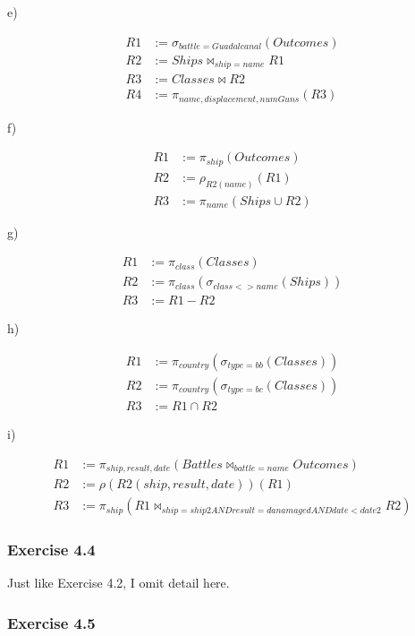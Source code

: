 e)

\begin{align*}
  R1 &:= \sigma_{battle = Guadalcanal}(Outcomes) \\
  R2 &:= Ships \bowtie_{ship = name} R1 \\
  R3 &:= Classes \bowtie R2 \\
  R4 &:= \pi_{name, displacement, numGuns}(R3)
\end{align*}

f)

\begin{align*}
  R1 &:= \pi_{ship}(Outcomes) \\
  R2 &:= \rho_{R2(name)}(R1) \\
  R3 &:= \pi_{name}(Ships \cup R2)
\end{align*}

g)

\begin{align*}
  R1 &:= \pi_{class}(Classes) \\
  R2 &:= \pi_{class}(\sigma_{class <> name}(Ships)) \\
  R3 &:= R1 - R2
\end{align*}

h)

\begin{align*}
  R1 &:= \pi_{country}(\sigma_{type=bb}(Classes)) \\
  R2 &:= \pi_{country}(\sigma_{type=bc}(Classes)) \\
  R3 &:= R1 \cap R2
\end{align*}

i)

\begin{align*}
  R1 &:= \pi_{ship, result, date}(Battles
         \bowtie_{battle = name} Outcomes) \\
  R2 &:= \rho(R2(ship, result, date))(R1) \\
  R3 &:= \pi_{ship}(R1 \bowtie_{ship = ship2 AND
         result = danamaged AND date < date2} R2)
\end{align*}

\subsubsection*{Exercise 4.4}

Just like Exercise 4.2, I omit detail here.

\subsubsection*{Exercise 4.5}

